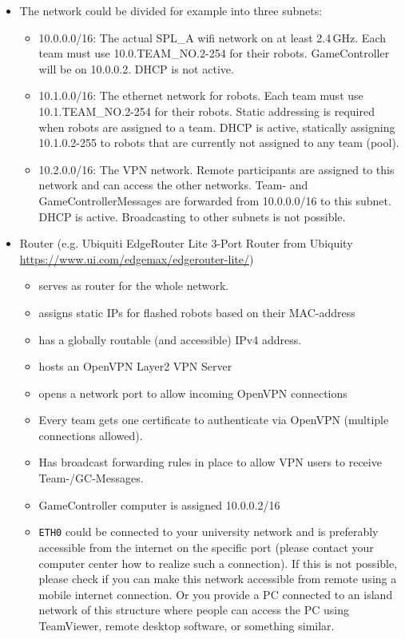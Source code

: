 \begin{itemize}
    \item  The network could be divided for example into three subnets:
    \begin{itemize}
        \item 10.0.0.0/16: The actual SPL\_A wifi network on at least 2.4\,GHz. Each team must use 10.0.TEAM\_NO.2-254 for their robots. GameController will be on 10.0.0.2. DHCP is not active.
        \item 10.1.0.0/16: The ethernet network for robots. Each team must use 10.1.TEAM\_NO.2-254 for their robots. Static addressing is required when robots are assigned to a team. DHCP is active, statically assigning 10.1.0.2-255 to robots that are currently not assigned to any team (pool).
        \item 10.2.0.0/16: The VPN network. Remote participants are assigned to this network and can access the other networks. Team- and GameControllerMessages are forwarded from 10.0.0.0/16 to this subnet. DHCP is active. Broadcasting to other subnets is not possible.
    \end{itemize}
    \item Router (e.g. Ubiquiti EdgeRouter Lite 3-Port Router from Ubiquity \url{https://www.ui.com/edgemax/edgerouter-lite/})
    \begin{itemize}
        \item serves as router for the whole network.
        \item assigns static IPs for flashed robots based on their MAC-address
        \item has a globally routable (and accessible) IPv4 address.
        \item hosts an OpenVPN Layer2 VPN Server
        \item opens a network port to allow incoming OpenVPN connections
        \item Every team gets one certificate to authenticate via OpenVPN (multiple connections allowed).
        \item Has broadcast forwarding rules in place to allow VPN users to receive Team-/GC-Messages.
        \item GameController computer is assigned 10.0.0.2/16
        \item \texttt{ETH0} could be connected to your university network and is preferably accessible from the internet on the specific port (please contact your computer center how to realize such a connection). If this is not possible, please check if you can make this network accessible from remote using a mobile internet connection. Or you provide a PC connected to an island network of this structure where people can access the PC using TeamViewer, remote desktop software, or something similar. 

\end{itemize}
\end{itemize}
